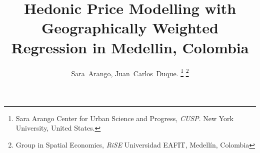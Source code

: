 \documentclass[journal]{IEEEtran}
\begin{document}
%
\title{Hedonic Price Modelling with Geographically Weighted Regression in Medellin, Colombia}
%
%
%

\author{Sara~Arango,
        Juan~Carlos~Duque.%
\thanks{Sara Arango Center for Urban Science and Progress, \textit{CUSP}. 
New York University, United States.}%
\thanks{Group in Spatial Economics, \textit{RiSE} 
Universidad EAFIT, Medellín, Colombia}}

% 
%



% 
\end{document}
